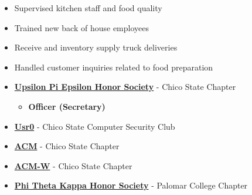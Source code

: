 \documentclass[10pt,a4paper,ragged2e,withhyper]{altacv}
\begin{document}
\begin{paracol}{2}
\begin{itemize}
    \item Supervised kitchen staff and food quality
    \item Trained new back of house employees
    \item Receive and inventory supply truck deliveries
    \item Handled customer inquiries related to food preparation
\end{itemize}


\begin{itemize}
    \item \underline{\textbf{Upsilon Pi Epsilon Honor Society}} - Chico State Chapter
    \begin{itemize}
        \item \textbf{Officer (Secretary)}
    \end{itemize}
\end{itemize}

\begin{itemize}
    \item \underline{\textbf{Usr0}} - Chico State Computer Security Club
\end{itemize}

\begin{itemize}
    \item \underline{\textbf{ACM}} - Chico State Chapter
\end{itemize}

\begin{itemize}
    \item \underline{\textbf{ACM-W}} - Chico State Chapter
\end{itemize}

\begin{itemize}
    \item \underline{\textbf{Phi Theta Kappa Honor Society}} - Palomar College Chapter
\end{itemize}


\switchcolumn



\end{paracol}
\end{document}
